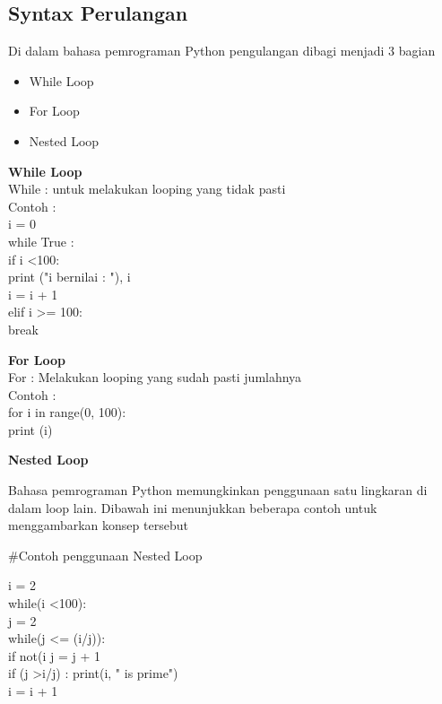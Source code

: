 \documentclass{article}
\begin{document}
\subsection{Syntax Perulangan}

\item Di dalam bahasa pemrograman Python pengulangan dibagi menjadi 3 bagian

\begin{itemize}
    \item While Loop
    \item For Loop
    \item Nested Loop
\end{itemize}

\item \textbf{While Loop} \\ 
While : untuk melakukan looping yang tidak pasti\\
Contoh :\\
i = 0\\
while True :\\
    if i \textless 100:\\
        print ("i bernilai : "), i\\
        i = i + 1\\
    elif i \textgreater = 100:\\
        break\\
        
\item \textbf{For Loop}\\
For : Melakukan looping yang sudah pasti jumlahnya\\
Contoh :\\
for i in range(0, 100):\\
    print (i)\\
    
\item \textbf{Nested Loop}

\item Bahasa pemrograman Python memungkinkan penggunaan satu lingkaran di dalam loop lain. Dibawah ini menunjukkan beberapa contoh untuk menggambarkan konsep tersebut

#Contoh penggunaan Nested Loop

i = 2\\
while(i \textless 100):\\
    j = 2\\
    while(j \textless= (i/j)):\\
        if not(i%
        j = j + 1\\
    if (j \textgreater i/j) : print(i, " is prime")\\
    i = i + 1\\
\end{document}
